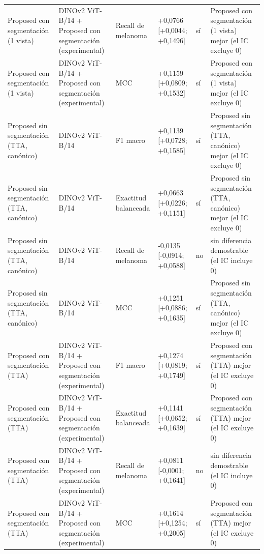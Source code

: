 \begin{longtable}{@{}llllll@{}}
Proposed con segmentación (1 vista) & DINOv2 ViT-B/14 + Proposed con segmentación (experimental) & Recall de melanoma & +0,0766 [+0,0044; +0,1496] & sí & Proposed con segmentación (1 vista) mejor (el IC excluye 0) \\
Proposed con segmentación (1 vista) & DINOv2 ViT-B/14 + Proposed con segmentación (experimental) & MCC & +0,1159 [+0,0809; +0,1532] & sí & Proposed con segmentación (1 vista) mejor (el IC excluye 0) \\
Proposed sin segmentación (TTA, canónico) & DINOv2 ViT-B/14 & F1 macro & +0,1139 [+0,0728; +0,1585] & sí & Proposed sin segmentación (TTA, canónico) mejor (el IC excluye 0) \\
Proposed sin segmentación (TTA, canónico) & DINOv2 ViT-B/14 & Exactitud balanceada & +0,0663 [+0,0226; +0,1151] & sí & Proposed sin segmentación (TTA, canónico) mejor (el IC excluye 0) \\
Proposed sin segmentación (TTA, canónico) & DINOv2 ViT-B/14 & Recall de melanoma & -0,0135 [-0,0914; +0,0588] & no & sin diferencia demostrable (el IC incluye 0) \\
Proposed sin segmentación (TTA, canónico) & DINOv2 ViT-B/14 & MCC & +0,1251 [+0,0886; +0,1635] & sí & Proposed sin segmentación (TTA, canónico) mejor (el IC excluye 0) \\
Proposed con segmentación (TTA) & DINOv2 ViT-B/14 + Proposed con segmentación (experimental) & F1 macro & +0,1274 [+0,0819; +0,1749] & sí & Proposed con segmentación (TTA) mejor (el IC excluye 0) \\
Proposed con segmentación (TTA) & DINOv2 ViT-B/14 + Proposed con segmentación (experimental) & Exactitud balanceada & +0,1141 [+0,0652; +0,1639] & sí & Proposed con segmentación (TTA) mejor (el IC excluye 0) \\
Proposed con segmentación (TTA) & DINOv2 ViT-B/14 + Proposed con segmentación (experimental) & Recall de melanoma & +0,0811 [-0,0001; +0,1641] & no & sin diferencia demostrable (el IC incluye 0) \\
Proposed con segmentación (TTA) & DINOv2 ViT-B/14 + Proposed con segmentación (experimental) & MCC & +0,1614 [+0,1254; +0,2005] & sí & Proposed con segmentación (TTA) mejor (el IC excluye 0) \\
\bottomrule
\end{longtable}
\endgroup

